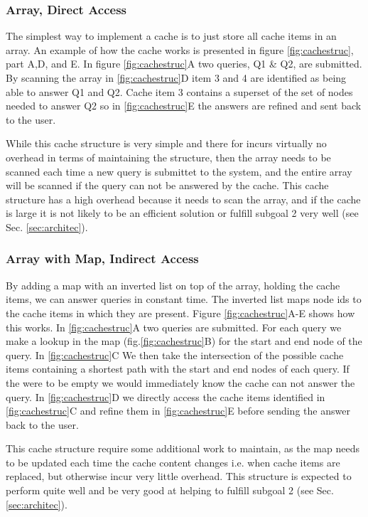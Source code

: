 \subsubsection{Array, Direct Access}

The simplest way to implement a cache is to just store all cache items in an array. An example of how the cache works is presented in  figure \ref{fig:cachestruc}, part A,D, and E. In figure \ref{fig:cachestruc}A two \spath queries, Q1 \& Q2, are submitted. By scanning the array in \ref{fig:cachestruc}D item 3 and 4 are identified as being able to answer Q1 and Q2. Cache item 3 contains a superset of the set of nodes needed to answer Q2 so in \ref{fig:cachestruc}E the answers are refined and sent back to the user.

While this cache structure is very simple and there for incurs virtually no overhead in terms of maintaining the structure, then the array needs to be scanned each time a new query is submittet to the system, and the entire array will be scanned if the query can not be answered by the cache. This cache structure has a high overhead because it needs to scan the array, and if the cache is large it is not likely to be an efficient solution or fulfill subgoal 2 very well (see Sec. \ref{sec:architec}).


\subsubsection{Array with Map, Indirect Access}
By adding a map with an inverted list on top of the array, holding the cache items, we can answer queries in constant time. The inverted list maps node ids to the cache items in which they are present. Figure \ref{fig:cachestruc}A-E shows how this works. In \ref{fig:cachestruc}A two queries are submitted. For each query we make a lookup in the map (fig.\ref{fig:cachestruc}B) for the start and end node of the query. In \ref{fig:cachestruc}C We then take the intersection of the possible cache items containing a shortest path with the start and end nodes of each query. If the were to be empty we would immediately know the cache can not answer the query. In \ref{fig:cachestruc}D we directly access the cache items identified in \ref{fig:cachestruc}C and refine them in \ref{fig:cachestruc}E before sending the answer back to the user.

This cache structure require some additional work to maintain, as the map needs to be updated each time the cache content changes i.e. when cache items are replaced, but otherwise incur very little overhead. This structure is expected to perform quite well and be very good at helping to fulfill subgoal 2 (see Sec. \ref{sec:architec}).

